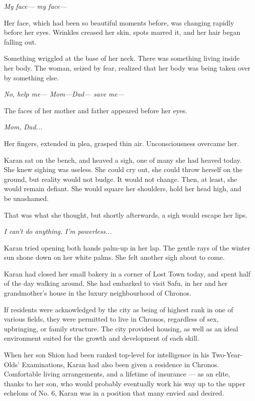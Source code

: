 \emph{My face--- my face---}

Her face, which had been so beautiful moments before, was changing
rapidly before her eyes. Wrinkles creased her skin, spots marred it, and
her hair began falling out.

Something wriggled at the base of her neck. There was something living
inside her body. The woman, seized by fear, realized that her body was
being taken over by something else.

\emph{No, help me--- Mom---Dad--- save me---}

The faces of her mother and father appeared before her eyes.

\emph{Mom, Dad...}

Her fingers, extended in plea, grasped thin air. Unconsciousness
overcame her.

\mybreak

Karan sat on the bench, and heaved a sigh, one of many she had heaved
today. She knew sighing was useless. She could cry out, she could throw
herself on the ground, but reality would not budge. It would not change.
Then, at least, she would remain defiant. She would square her
shoulders, hold her head high, and be unashamed.

That was what she thought, but shortly afterwards, a sigh would escape
her lips.

\emph{I can't do anything. I'm powerless...}

Karan tried opening both hands palm-up in her lap. The gentle rays of
the winter sun shone down on her white palms. She felt another sigh
about to come.

Karan had closed her small bakery in a corner of Lost Town today, and
spent half of the day walking around. She had embarked to visit Safu, in
her and her grandmother's house in the luxury neighbourhood of Chronos.

If residents were acknowledged by the city as being of highest rank in
one of various fields, they were permitted to live in Chronos,
regardless of sex, upbringing, or family structure. The city provided
housing, as well as an ideal environment suited for the growth and
development of each skill.

When her son Shion had been ranked top-level for intelligence in his
Two-Year-Olds' Examinations, Karan had also been given a residence in
Chronos. Comfortable living arrangements, and a lifetime of insurance ---
as an elite, thanks to her son, who would probably eventually work his
way up to the upper echelons of No. 6, Karan was in a position that many
envied and desired.


